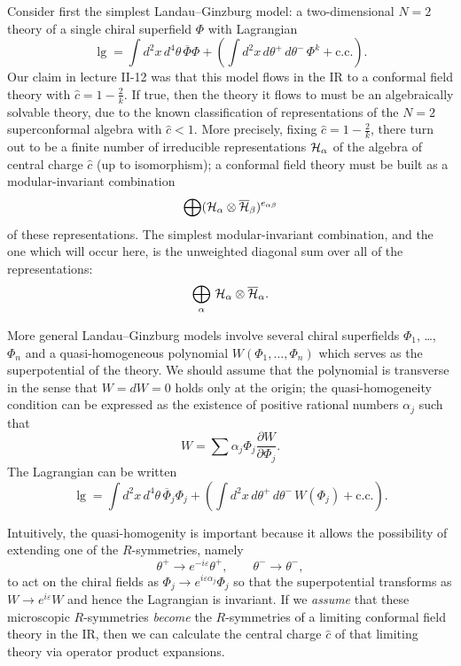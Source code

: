Consider first the simplest Landau--Ginzburg model: a two-dimensional $N{=}2$
theory of a
single chiral superfield $\Phi$ with Lagrangian
$$\lg=\int d^2x\,d^4\theta\,\overline{\Phi}\Phi+\left(\int
d^2x\,d\theta^+\,d\theta^-\,\Phi^k
+ \mbox{c.c.}\right) .$$
Our claim in lecture II-12 was that this model flows in the IR to a conformal
field
theory with $\widehat{c}=1-\frac2k$.  If true, then the theory it flows to
must be an
algebraically solvable theory, due to the known classification of
representations of
the $N{=}2$ superconformal algebra with $\widehat{c}<1$.  More precisely,
fixing $\widehat{c}=1-\frac2k$,
there turn out to be a finite number of
 irreducible representations ${\cal H}_\alpha$ of the algebra of
central charge $\widehat{c}$ (up to isomorphism); a conformal field theory
must be built as
a modular-invariant combination
$$\bigoplus ({\cal H}_\alpha\otimes\overline{\cal H}_\beta)^{e_{\alpha\beta}}$$
of these representations.  The simplest modular-invariant combination, and the
one which will
occur here, is the unweighted diagonal sum over all of the representations:
$$\bigoplus_\alpha\,{\cal H}_\alpha\otimes\overline{\cal H}_\alpha.$$

More general Landau--Ginzburg models involve several chiral superfields
$\Phi_1$, \dots,
$\Phi_n$ and a quasi-homogeneous polynomial $W(\Phi_1,\dots,\Phi_n)$ which
serves as the
superpotential of the theory.  We should assume that the polynomial is
transverse in the
sense that $W=dW=0$ holds only at the origin; the quasi-homogeneity condition
can be expressed
as the existence of positive rational numbers $\alpha_j$ such that
$$W=\sum \alpha_j\Phi_j\frac{\partial W}{\partial \Phi_j}.$$
The Lagrangian can be written
$$\lg=\int d^2x\,d^4\theta\,\overline{\Phi}_j\Phi_j+\left(\int
d^2x\,d\theta^+\,d\theta^-\,W(\Phi_j)
+ \mbox{c.c.}\right) .$$


Intuitively, the quasi-homogenity is important because it allows the
possibility of extending
one of the $R$-symmetries, namely
$$\theta^+\to e^{-i\varepsilon}\theta^+,\qquad \theta^-\to\theta^-,$$
to act on the chiral fields as $\Phi_j\to e^{i\varepsilon\alpha_j}\Phi_j$ so
that the superpotential
transforms as $W\to e^{i\varepsilon}W$ and hence the Lagrangian is invariant.
If we {\it assume}\/
that these microscopic $R$-symmetries {\it become}\/ the $R$-symmetries of a
limiting conformal
field theory in the IR, then we can calculate the central charge $\widehat{c}$
 of that limiting
theory via operator product expansions.

